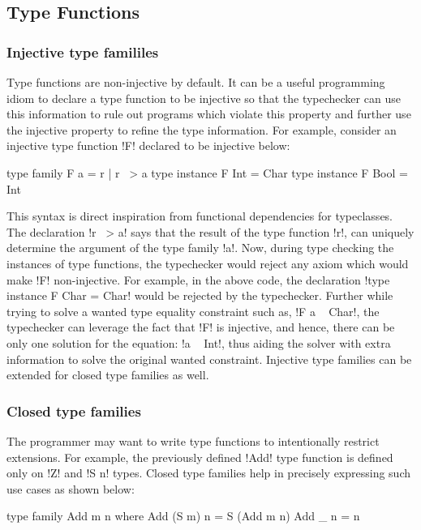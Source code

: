 \documentclass[screen,nonacm,manuscript,review]{acmart} %
\begin{document}
\subsection{Type Functions}\label{sec:rw-type-fun}
\subsubsection{Injective type famililes}
Type functions are non-injective by default. It can be a useful programming idiom to declare a type function to be injective so that the typechecker can use this information to rule out programs which violate this property and further use the injective property to refine the type information. For example, consider an injective type function !F! declared to be injective below:

\begin{CenteredBox}
\begin{code}
type family F a = r | r ~> a
type instance F Int = Char
type instance F Bool = Int
\end{code}
\end{CenteredBox}
This syntax is direct inspiration from functional dependencies for typeclasses. The declaration !r ~> a! says that the result of the type function !r!, can uniquely determine the argument of the type family !a!. Now, during type checking the instances of type functions, the typechecker would reject any axiom which would make !F! non-injective. For example, in the above code, the declaration !type instance F Char = Char! would be rejected by the typechecker. Further while trying to solve a wanted type equality constraint such as, !F a ~ Char!, the typechecker can leverage the fact that !F! is injective, and hence, there can be only one solution for the equation: !a ~ Int!, thus aiding the solver with extra information to solve the original wanted constraint. Injective type families\cite{stolarek_injective_2015} can be extended for closed type families as well.

\subsubsection{Closed type families}
The programmer may want to write type functions to intentionally restrict extensions. For example, the previously defined !Add! type function is defined only on !Z! and !S n! types. Closed type families\cite{eisenberg_typefamilies_2014} help in precisely expressing such use cases as shown below:

\begin{CenteredBox}
\begin{code}
type family Add m n where
  Add (S m) n = S (Add m n)
  Add _ n = n
\end{code}
\end{CenteredBox}
\end{document}
